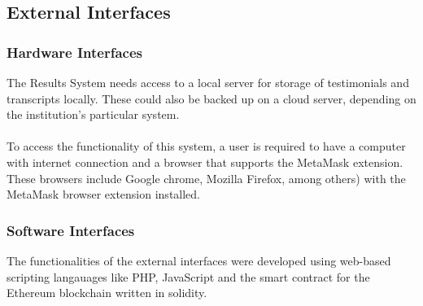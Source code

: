 \subsection{External Interfaces}
\subsubsection{Hardware Interfaces}
The Results System needs access to a local server for storage of testimonials and transcripts locally. These could also be backed up on a cloud server, depending on the institution's particular system.\\\\
To access the functionality of this system, a user is required to have a computer with internet connection and a browser that supports the MetaMask extension. These browsers include Google chrome, Mozilla Firefox, among others) with the MetaMask browser extension installed. 

\subsubsection{Software Interfaces}
The functionalities of the external interfaces were developed using web-based scripting langauages like PHP, JavaScript and the smart contract for the Ethereum blockchain written in solidity.